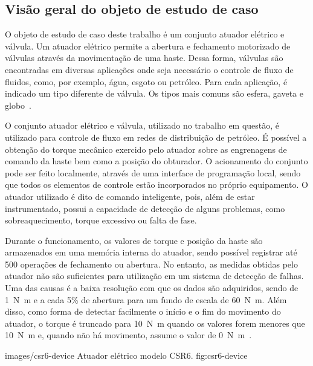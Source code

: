 

\subsection{Visão geral do objeto de estudo de caso}

O objeto de estudo de caso deste trabalho é um conjunto atuador elétrico e válvula. Um atuador
elétrico permite a abertura e fechamento motorizado de válvulas através da movimentação de uma
haste. Dessa forma, válvulas são encontradas em diversas aplicações onde seja necessário o controle
de fluxo de fluidos, como, por exemplo, água, esgoto ou petróleo. Para cada aplicação, é indicado um
tipo diferente de válvula. Os tipos mais comuns são esfera, gaveta e
globo~\cite{campos2006controles}.

O conjunto atuador elétrico e válvula, utilizado no trabalho em questão, é utilizado para controle
de fluxo em redes de distribuição de petróleo. É possível a obtenção do
torque mecânico exercido pelo atuador sobre as engrenagens de comando da haste bem como a posição do
obturador. O acionamento do conjunto pode ser feito localmente, através de uma interface de
programação local, sendo que todos os elementos de controle estão incorporados no próprio
equipamento. O atuador utilizado é dito de comando inteligente, pois, além de estar instrumentado,
possui a capacidade de detecção de alguns problemas, como sobreaquecimento, torque excessivo ou
falta de fase.

Durante o funcionamento, os valores de torque e posição da haste são armazenados em uma memória
interna do atuador, sendo possível registrar até \num{500} operações de fechamento ou abertura. No
entanto, as medidas obtidas pelo atuador não são suficientes para utilização em um sistema de
detecção de falhas. Uma das causas é a baixa resolução com que os dados são adquiridos, sendo de
\SI{1}{\newton\meter} e a cada 5\% de abertura para um fundo de escala de \SI{60}{\newton\meter}.
Além disso, como forma de detectar facilmente o início e o fim do movimento do atuador, o torque é
truncado para \SI{10}{\newton\meter} quando os valores forem menores que \SI{10}{\newton\meter} e,
quando não há movimento, assume o valor de \SI{0}{\newton\meter}~\cite{lazzaretti2012avaliacao}.

  {images/csr6-device}
  {Atuador elétrico modelo CSR6.}
  {fig:csr6-device}

